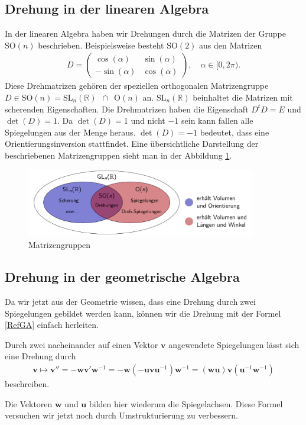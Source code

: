 \subsection{Drehung in der linearen Algebra}
In der linearen Algebra haben wir Drehungen durch die Matrizen der Gruppe $\text{SO}(n)$ beschrieben.
%
Beispielsweise besteht $\text{SO}(2)$  aus den Matrizen
\begin{align*}
D = 
\begin{pmatrix}
\cos(\alpha) & \sin(\alpha) \\
-\sin(\alpha) & \cos(\alpha) 
\end{pmatrix},\quad
\alpha \in [0, 2\pi).
\end{align*}
Diese Drehmatrizen gehören der speziellen orthogonalen Matrizengruppe $D\in \text{SO}(n) = \text{SL}_n(\mathbb{R})\enspace \cap \enspace \text{O}(n)$ an.
$\text{SL}_n(\mathbb{R})$ beinhaltet die Matrizen mit scherenden Eigenschaften.
Die Drehmatrizen haben die Eigenschaft $D^t D = E$ und $\det(D)=1$.
Da $\det(D) = 1$ und nicht $-1$ sein kann fallen alle Spiegelungen aus der Menge heraus.
$\det(D) = -1$ bedeutet, dass eine Orientierungsinversion stattfindet.
Eine übersichtliche Darstellung der beschriebenen Matrizengruppen sieht man in der Abbildung \ref{BildMatrizenGruppen}.

\begin{figure}
	\centering
	\includegraphics[width=10cm]{papers/clifford/Bilder/MatrizenGruppen.png}
	\caption{Matrizengruppen}
	\label{BildMatrizenGruppen}
\end{figure}

\subsection{Drehung in der geometrische Algebra}
Da wir jetzt aus der Geometrie wissen, dass eine Drehung durch zwei Spiegelungen gebildet werden kann, können wir die Drehung mit der Formel \eqref{RefGA} einfach herleiten.
\begin{satz}
	Durch zwei nacheinander auf einen Vektor $\mathbf{v}$ angewendete Spiegelungen lässt sich eine Drehung 
durch
	\begin{align} \label{rotGA}
\mathbf{v}\mapsto
	\mathbf{v}'' = -\mathbf{wv}'\mathbf{w}^{-1} = -\mathbf{w}(-\mathbf{uvu}^{-1})\mathbf{w}^{-1} = (\mathbf{wu})\mathbf{v}(\mathbf{u}^{-1}\mathbf{w}^{-1})
	\end{align}
	beschreiben.
\end{satz}
Die Vektoren $\mathbf{w}$ und $\mathbf{u}$ bilden hier wiederum die Spiegelachsen. Diese Formel versuchen wir jetzt noch durch Umstrukturierung zu verbessern. 
